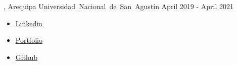 \documentclass[]{mcdowell-cv/mcdowellcv}
\begin{document}
\begin{cvsection}{}
	\begin{cvsubsection}
		{, Arequipa}
		{\mbox{Universidad Nacional de San Agustín}}
		{April 2019 - April 2021}
	\end{cvsubsection}
\end{cvsection}

\begin{cvsection}{}
	\begin{cvsubsection}{}{}{}
		\begin{itemize}
			\item \href{https://www.linkedin.com/in/luis-angel-prado-postigo-813916231/}{Linkedin}
			\item \href{https://luis-prado-portfolio.netlify.app/}{Portfolio}
			\item \href{https://github.com/lpradopostigo}{Github}
		\end{itemize}
	\end{cvsubsection}
\end{cvsection}
\end{document}
